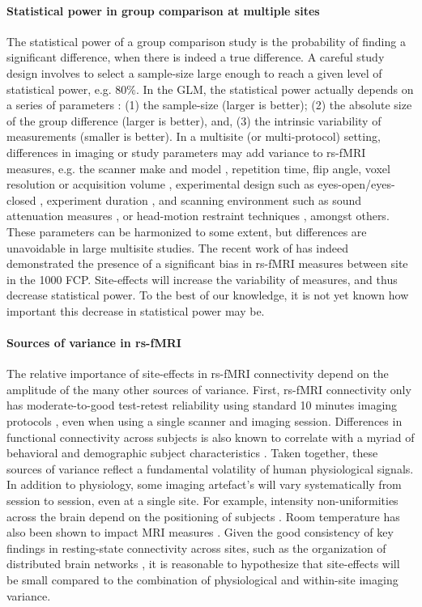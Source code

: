 \documentclass[authoryear]{elsarticle}
\begin{document}
\paragraph{Statistical power in group comparison at multiple sites}
The statistical power of a group comparison study is the probability of finding a significant difference, when there is indeed a true difference. A careful study design involves to select a sample-size large enough to reach a given level of statistical power, e.g. $80\%$. In the GLM, the statistical power actually depends on a series of parameters \citep{Desmond2002}: (1) the sample-size (larger is better); (2) the absolute size of the group difference (larger is better), and, (3) the intrinsic variability of measurements (smaller is better). 
In a multisite (or multi-protocol) setting, differences in imaging or study parameters may add variance to rs-fMRI measures, e.g. the scanner make and model \citep{Friedman2006}, repetition time, flip angle, voxel resolution or acquisition volume \citep{Friedman2006a}, experimental design such as eyes-open/eyes-closed \citep{Yan2009}, experiment duration \citep{VanDijk2010}, and scanning environment such as sound attenuation measures \citep{Elliott1999}, or head-motion restraint techniques \citep{Edward2000,VanDijk2012}, amongst others. These parameters can be harmonized to some extent, but differences are unavoidable in large multisite studies. The recent work of \cite{Yan2013h} has indeed demonstrated the presence of a significant bias in rs-fMRI measures between site in the 1000 FCP. Site-effects will increase the variability of measures, and thus decrease statistical power. To the best of our knowledge, it is not yet known how important this decrease in statistical power may be. 

\paragraph{Sources of variance in rs-fMRI}
The relative importance of site-effects in rs-fMRI connectivity depend on the amplitude of the many other sources of variance. First, rs-fMRI connectivity only has moderate-to-good test-retest reliability using standard 10 minutes imaging protocols \citep{Shehzad2009}, even when using a single scanner and imaging session. Differences in functional connectivity across subjects is also known to correlate with a myriad of behavioral and demographic subject characteristics \cite{Anand2007,Sheline2010,Kilpatrick2006}. Taken together, these sources of variance reflect a fundamental volatility of human physiological signals. In addition to physiology, some imaging artefact's will vary systematically from session to session, even at a single site. For example, intensity non-uniformities across the brain depend on the positioning of subjects \citep{Caramanos2010}. Room temperature has also been shown to impact MRI measures \citep{Vanhoutte2006}. Given the good consistency of key findings in resting-state connectivity across sites, such as the organization of distributed brain networks \citep{Biswal2010}, it is reasonable to hypothesize that site-effects will be small compared to the combination of physiological and within-site imaging variance.
\end{document}
